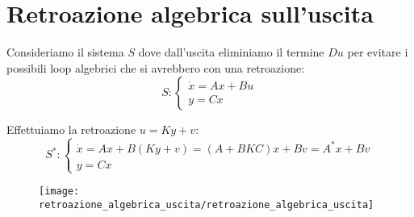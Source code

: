 \documentclass[../main.tex]{subfiles}
\begin{document}
	\section{Retroazione algebrica sull'uscita}
		Consideriamo il sistema $ S $ dove dall'uscita eliminiamo il termine $ Du $ per evitare i possibili loop algebrici che si avrebbero con una retroazione:
		\[
			S:
			\begin{cases}
				\dot x = Ax+Bu\\
				y = Cx
			\end{cases}
		\]
	
		Effettuiamo la retroazione $ u = Ky +v $:
		\[
			S^{*}:
			\begin{cases}
				\dot x = Ax + B(Ky+v) = (A+BKC)x + Bv = A^{*}x + Bv\\
				y = Cx
			\end{cases}
		\]
		
		\begin{figure}[H]
			\centering\texttt{[image: retroazione\_algebrica\_uscita/retroazione\_algebrica\_uscita]}
		\end{figure}
	
\end{document}
